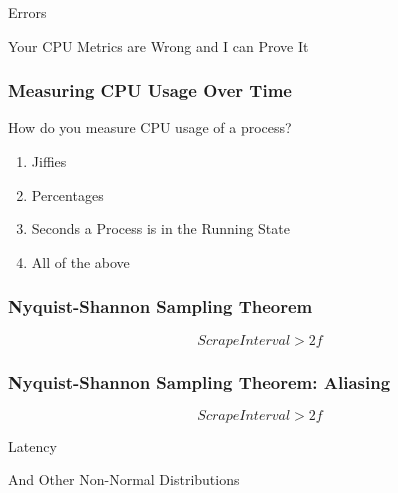 \begin{frame}[standout]
    Errors

    \small
    Your CPU Metrics are Wrong and I can Prove It
\end{frame}


\begin{frame}[fragile]
    \frametitle{Measuring CPU Usage Over Time}

    How do you measure CPU usage of a process?
    \begin{enumerate}[label=\alph*.]
        \item Jiffies
        \item Percentages
        \item Seconds a Process is in the Running State
        \item All of the above
    \end{enumerate}
\end{frame}

\begin{frame}
    \frametitle{Nyquist-Shannon Sampling Theorem}
    \begin{figure}[!h]
        \centering
        
    \end{figure}
    $$ Scrape Interval > 2f $$
\end{frame}
\begin{frame}
    \frametitle{Nyquist-Shannon Sampling Theorem: Aliasing}
    \begin{figure}[!h]
        \centering
        
    \end{figure}
    $$ Scrape Interval > 2f $$
\end{frame}

\begin{frame}[standout]
    Latency

    \small
    And Other Non-Normal Distributions
\end{frame}


